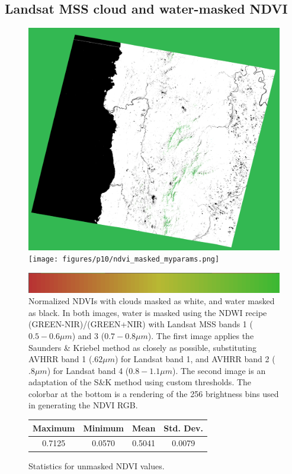 \documentclass[12pt]{article}
\begin{document}
\subsection{Landsat MSS cloud and water-masked NDVI}

\begin{figure}[h!]
    \centering
    \includegraphics[width=.48\linewidth]{figures/p10/ndvi_masked_skparams.png}
    \texttt{[image: figures/p10/ndvi\_masked\_myparams.png]}

    \vspace{.2em}
    \includegraphics[width=.48\linewidth]{figures/p10/cbar.png}
    \caption{Normalized NDVIs with clouds masked as white, and water masked as black. In both images, water is masked using the NDWI recipe (GREEN-NIR)/(GREEN+NIR) with Landsat MSS bands 1 ($0.5-0.6\mu m$) and 3 ($0.7-0.8\mu m$). The first image applies the Saunders \& Kriebel method as closely as possible, substituting AVHRR band 1 ($.62\mu m$) for Landsat band 1, and AVHRR band 2 ($.8\mu m$) for Landsat band 4 ($0.8-1.1\mu m$). The second image is an adaptation of the S\&K method using custom thresholds. The colorbar at the bottom is a rendering of the 256 brightness bins used in generating the NDVI RGB.}
    \label{p9_landsat}
\end{figure}

\begin{figure}[h!]
    \centering
    \begin{tabular}{ c c c c }
        Maximum & Minimum & Mean & Std. Dev. \\
        \hline
        0.7125 & 0.0570 & 0.5041 & 0.0079 \\
    \end{tabular}
    \caption{Statistics for unmasked NDVI values.}
    \label{p9_stats}
\end{figure}
\end{document}
